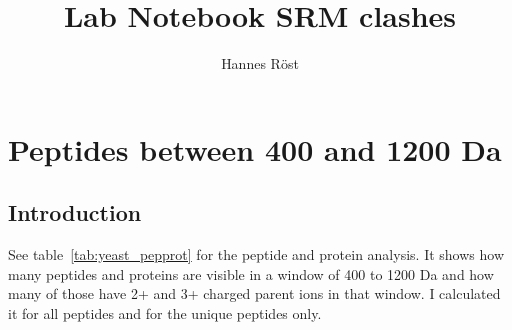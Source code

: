 

\usepackage{gensymb}
\usepackage{hyphenat}
\usepackage{subfig}
\usepackage{verbatim} 

\usepackage{booktabs} %
\newcommand*\maketablespace{ \addlinespace[15pt] }



\author{Hannes Röst}
\title{Lab Notebook SRM clashes}
\maketitle

\tableofcontents

\section{Peptides between 400 and 1200 Da}

\subsection{Introduction}


See table~\ref{tab:yeast_pepprot} for the peptide and protein analysis. It
shows how many peptides and proteins are visible in a window of 400 to 1200 Da
and how many of those have 2+ and 3+ charged parent ions in that window. I
calculated it for all peptides and for the unique peptides only.

